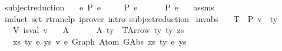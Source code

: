 \begin{isabellebody}
\isamarkupfalse%
\ subject{\isacharunderscore}{\kern0pt}reduction{\isacharprime}{\kern0pt}{\isacharcolon}{\kern0pt}\isanewline
\ \ \ {\isachardoublequoteopen}e\ {\isacharminus}{\kern0pt}{\isachargreater}{\kern0pt}{\isacharbraceleft}{\kern0pt}P{\isacharbraceright}{\kern0pt}{\isacharasterisk}{\kern0pt}\ e{\isacharprime}{\kern0pt}{\isachardoublequoteclose}\isanewline
\ \ \ \ {\isachardoublequoteopen}{\isasymGamma}\ {\isasymturnstile}{\isacharbraceleft}{\kern0pt}P{\isacharbraceright}{\kern0pt}\ e\ {\isacharcolon}{\kern0pt}\ {\isasymtau}{\isachardoublequoteclose}\isanewline
\ \ \ {\isachardoublequoteopen}{\isasymGamma}\ {\isasymturnstile}{\isacharbraceleft}{\kern0pt}P{\isacharbraceright}{\kern0pt}\ e{\isacharprime}{\kern0pt}\ {\isacharcolon}{\kern0pt}\ {\isasymtau}{\isachardoublequoteclose}\isanewline
%
\isadelimproof
%
\endisadelimproof
%
\isatagproof
{}\isamarkupfalse%
\ assms\isanewline
\ \ \isamarkupfalse%
\ {\isacharparenleft}{\kern0pt}induct\ set{\isacharcolon}{\kern0pt}\ rtranclp{\isacharparenright}{\kern0pt}\ {\isacharparenleft}{\kern0pt}iprover\ intro{\isacharcolon}{\kern0pt}\ subject{\isacharunderscore}{\kern0pt}reduction{\isacharparenright}{\kern0pt}{\isacharplus}{\kern0pt}%
\endisatagproof
{\isafoldproof}%
%
\isadelimproof
%
\endisadelimproof
%
\isadelimdocument
%
\endisadelimdocument
%
\isatagdocument
%
\isamarkuptrue%
%
\endisatagdocument
{\isafolddocument}%
%
\isadelimdocument
%
\endisadelimdocument
{}\isamarkupfalse%
\ inv{\isacharunderscore}{\kern0pt}abs{}{\isacharcolon}{\kern0pt}\isanewline
\ \ \ T{\isacharcolon}{\kern0pt}\ {\isachardoublequoteopen}{\isasymGamma}\ {\isasymturnstile}{\isacharbraceleft}{\kern0pt}P{\isacharbraceright}{\kern0pt}\ v\ {\isacharcolon}{\kern0pt}\ ty{\isachardoublequoteclose}\isanewline
\ \ \ V{\isacharcolon}{\kern0pt}\ {\isachardoublequoteopen}is{\isacharunderscore}{\kern0pt}val\ v{\isachardoublequoteclose}\isanewline
\ \ \ A{}{\isacharcolon}{\kern0pt}\ {\isachardoublequoteopen}{\isasymGamma}\ {\isacharequal}{\kern0pt}\ {\isacharbrackleft}{\kern0pt}{\isacharbrackright}{\kern0pt}{\isachardoublequoteclose}\isanewline
\ \ \ A{}{\isacharcolon}{\kern0pt}\ {\isachardoublequoteopen}ty\ {\isacharequal}{\kern0pt}\ TArrow\ ty{}\ ty{}\ zs{\isachardoublequoteclose}\isanewline
\ \ \ {\isachardoublequoteopen}{\isasymexists}xs\ ty{}{\isacharprime}{\kern0pt}\ e{\isacharprime}{\kern0pt}\ ys{\isachardot}{\kern0pt}\ v\ {\isasymsimeq}e\ Graph\ {\isacharparenleft}{\kern0pt}Atom\ {\isacharparenleft}{\kern0pt}GAbs\ xs\ ty{}{\isacharprime}{\kern0pt}\ e{\isacharprime}{\kern0pt}{\isacharparenright}{\kern0pt}\ ys{\isacharparenright}{\kern0pt}{\isachardoublequoteclose}\isanewline

\end{isabellebody}
